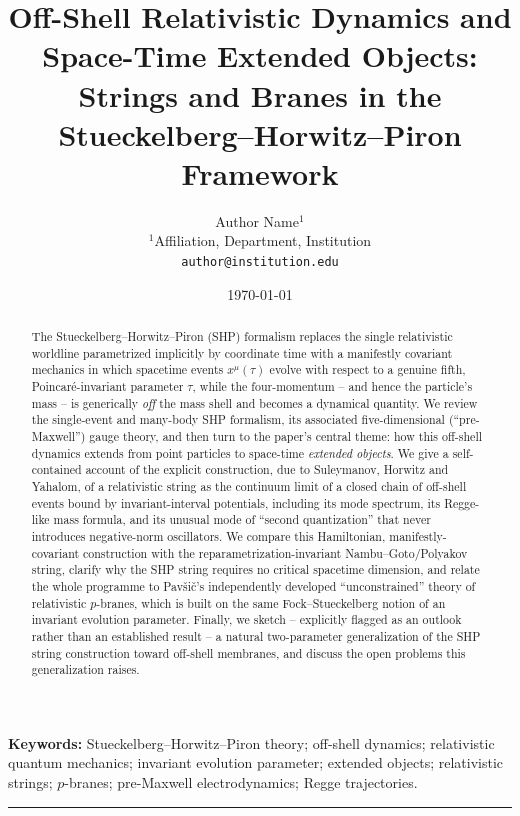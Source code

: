 \documentclass[11pt]{article}
\title{\textbf{Off-Shell Relativistic Dynamics and Space-Time Extended Objects:\\[2pt]
\large Strings and Branes in the Stueckelberg--Horwitz--Piron Framework}}
\author{Author Name$^{1}$\\
\small $^1$Affiliation, Department, Institution\\
\small \texttt{author@institution.edu}}
\date{\today}
\begin{document}
\sloppy

\maketitle

\begin{abstract}
\noindent
The Stueckelberg--Horwitz--Piron (SHP) formalism replaces the single relativistic
worldline parametrized implicitly by coordinate time with a manifestly covariant
mechanics in which spacetime events $x^\mu(\tau)$ evolve with respect to a genuine
fifth, Poincar\'e-invariant parameter $\tau$, while the four-momentum -- and hence
the particle's mass -- is generically \emph{off} the mass shell and becomes a
dynamical quantity. We review the single-event and many-body SHP formalism, its
associated five-dimensional (``pre-Maxwell'') gauge theory, and then turn to the
paper's central theme: how this off-shell dynamics extends from point particles to
space-time \emph{extended objects}. We give a self-contained account of the explicit
construction, due to Suleymanov, Horwitz and Yahalom, of a relativistic string as
the continuum limit of a closed chain of off-shell events bound by invariant-interval
potentials, including its mode spectrum, its Regge-like mass formula, and its
unusual mode of ``second quantization'' that never introduces negative-norm
oscillators. We compare this Hamiltonian, manifestly-covariant construction with
the reparametrization-invariant Nambu--Goto/Polyakov string, clarify why the SHP
string requires no critical spacetime dimension, and relate the whole programme to
Pavši\v{c}'s independently developed ``unconstrained'' theory of relativistic
$p$-branes, which is built on the same Fock--Stueckelberg notion of an invariant
evolution parameter. Finally, we sketch -- explicitly flagged as an outlook rather
than an established result -- a natural two-parameter generalization of the SHP
string construction toward off-shell membranes, and discuss the open problems this
generalization raises.
\end{abstract}

\noindent\textbf{Keywords:} Stueckelberg--Horwitz--Piron theory; off-shell dynamics;
relativistic quantum mechanics; invariant evolution parameter; extended objects;
relativistic strings; $p$-branes; pre-Maxwell electrodynamics; Regge trajectories.

\vspace{4pt}
\hrule
\vspace{4pt}

{\small\tableofcontents}
\end{document}
